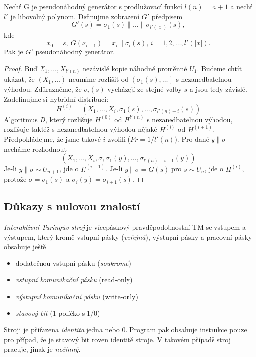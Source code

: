 \begin{thm}
	Nechť G je pseudonáhodný generátor s prodlužovací funkcí $l(n)=n+1$ a nechť $l'$ je libovolný polynom. Definujme zobrazení $G'$ předpisem
	\[
		G'(s)=\sigma_1(s)\parallel\dots\parallel\sigma_{l'(|x|)}(s),
	\]
	kde
	\[
		x_0=s,\ G(x_{i-1})=x_i\parallel\sigma_i(s),\, i=1,2,\dots,l'(|x|).
	\]
	Pak je $G'$ pseudonáhodný generátor.
	\begin{proof}
		Buď $X_1,\dots,X_{l'(n)}$ nezávislé kopie náhodné proměnné $U_1$. Budeme chtít ukázat, že $(X_1,\dots)$ neumíme rozlišit od $(\sigma_1(s),\dots)$ s nezanedbatelnou výhodou. Zdůrazněme, že $\sigma_i(s)$ vycházejí ze stejné volby $s$ a jsou tedy závislé. Zadefinujme si hybridní distribuci:
		\[
			H^{(i)}=(X_1,\dots,X_i,\sigma_1(s),\dots,\sigma_{l'(n)-i}(s))
		\]
		Algoritmus $D$, který rozlišuje $H^{(0)}$ od $H^{l'(n)}$ s nezanedbatelnou výhodou, rozlišuje taktéž s nezanedbatelnou výhodou nějaké $H^{(i)}$ od $H^{(i+1)}$. Předpokládejme, že jsme takové $i$ zvolili ($Pr=1/l'(n)$). Pro dané $y\parallel\sigma$ necháme rozhodnout
		\[
			(X_1,\dots,X_i,\sigma,\sigma_1(y),\dots,\sigma_{l'(n)-i-1}(y))
		\]
		Je-li $y\parallel\sigma\sim U_{n+1}$, jde o $H^{(i+1)}$. Je-li $y\parallel\sigma=G(s)$ pro $s \sim U_n$, jde o $H^{(i)}$, protože $\sigma=\sigma_1(s)$ a $\sigma_i(y)=\sigma_{i+1}(s)$.
	\end{proof}
\end{thm}

\subsection*{Důkazy s nulovou znalostí}
\begin{defn}[ITM]
	\textit{Interaktivní Turingův stroj} je vícepáskový pravděpodobnostní TM se vstupem a výstupem, který kromě vstupní pásky (\textit{veřejná}), výstupní pásky a pracovní pásky obsahuje ještě
	\begin{itemize}
		\item dodatečnou vstupní pásku (\textit{soukromá})
		\item \textit{vstupní komunikační pásku} (read-only)
		\item \textit{výstupní komunikační pásku} (write-only)
		\item \textit{stavový bit} (1 políčko s 1/0)
	\end{itemize}
	Stroji je přiřazena \textit{identita} jedna nebo 0. Program pak obsahuje instrukce pouze pro případ, že je stavový bit roven identitě stroje. V takovém případě stroj pracuje, jinak je \textit{nečinný}.
\end{defn}

